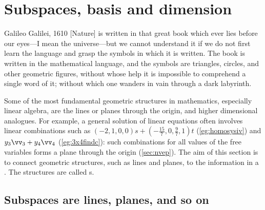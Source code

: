 
\section{Subspaces, basis and dimension}
\label{sec:sbd}
\secttoc

\begin{comment}
\pooliv{\S3.5, p191--206} \layiv{\S4.1--3} \holti{\S4.1--3}
\end{comment}


\begin{quoted}{Galileo Galilei, 1610}
[Nature] is written in that great book which ever lies before our eyes---I mean the universe---but we cannot understand it if we do not first learn the language and grasp the symbols in which it is written. 
The book is written in the mathematical language, and the symbols are triangles, circles, and other geometric figures, without whose help it is impossible to comprehend a single word of it; without which one wanders in vain through a dark labyrinth.
\end{quoted}


Some of the most fundamental geometric structures in mathematics, especially linear algebra, are the lines or planes through the origin, and higher dimensional analogues.
For example, a general solution of linear equations often involves linear combinations such as \((-2,1,0,0)s+(-\frac{15}7,0,\frac97,1)t\) (\cref{eg:homosysiv}) and \(y_3\vv_3+y_4\vv_4\) (\cref{eg:3x4findc}): such combinations for all values of the free variables forms a plane through the origin (\cref{sec:nvep}).
The aim of this section is to connect geometric structures, such as lines and planes, to the information in a .
The structures are called s.


\subsection{Subspaces are lines, planes, and so on}

